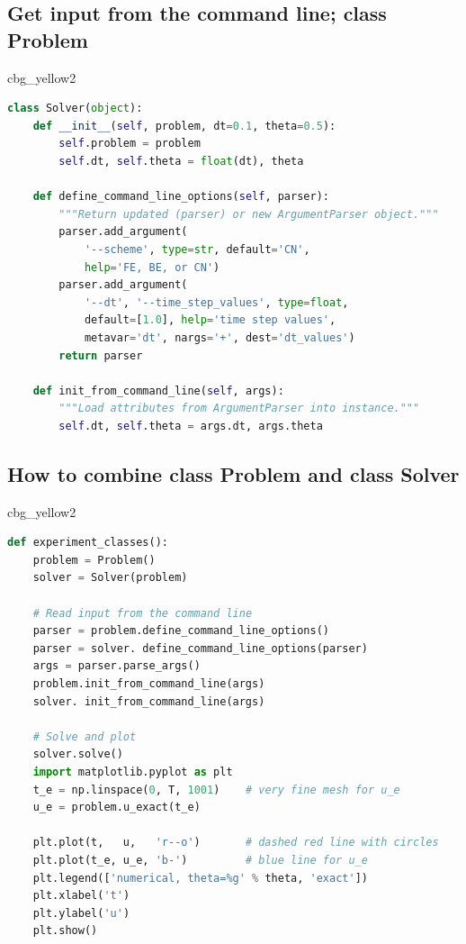 \documentclass[%
oneside,                 %
final,                   %
10pt]{article}
\newenvironment{_cod_tight}[1]{
   \def\FrameCommand{\colorbox{#1}}
   \FrameRule0.6pt\MakeFramed {\FrameRestore}\vskip3mm}
   {\vskip0mm\endMakeFramed}
\newenvironment{cod}[1]{
\bgroup\rmfamily
\fboxsep=0mm\relax
\begin{_cod_tight}{#1}
\list{}{\parsep=-2mm\parskip=0mm\topsep=0pt\leftmargin=2mm
\rightmargin=2\leftmargin\leftmargin=4pt\relax}
\item\relax}
{\endlist\end{_cod_tight}\egroup}
\begin{document}
\subsection*{Get input from the command line; class Problem}

\begin{cod}{cbg_yellow2}\begin{lstlisting}[language=Python,style=simple,xleftmargin=2mm]
class Solver(object):
    def __init__(self, problem, dt=0.1, theta=0.5):
        self.problem = problem
        self.dt, self.theta = float(dt), theta

    def define_command_line_options(self, parser):
        """Return updated (parser) or new ArgumentParser object."""
        parser.add_argument(
            '--scheme', type=str, default='CN',
            help='FE, BE, or CN')
        parser.add_argument(
            '--dt', '--time_step_values', type=float,
            default=[1.0], help='time step values',
            metavar='dt', nargs='+', dest='dt_values')
        return parser

    def init_from_command_line(self, args):
        """Load attributes from ArgumentParser into instance."""
        self.dt, self.theta = args.dt, args.theta
\end{lstlisting}\end{cod}
\noindent

\subsection*{How to combine class Problem and class Solver}

\begin{cod}{cbg_yellow2}\begin{lstlisting}[language=Python,style=simple,xleftmargin=2mm]
def experiment_classes():
    problem = Problem()
    solver = Solver(problem)

    # Read input from the command line
    parser = problem.define_command_line_options()
    parser = solver. define_command_line_options(parser)
    args = parser.parse_args()
    problem.init_from_command_line(args)
    solver. init_from_command_line(args)

    # Solve and plot
    solver.solve()
    import matplotlib.pyplot as plt
    t_e = np.linspace(0, T, 1001)    # very fine mesh for u_e
    u_e = problem.u_exact(t_e)

    plt.plot(t,   u,   'r--o')       # dashed red line with circles
    plt.plot(t_e, u_e, 'b-')         # blue line for u_e
    plt.legend(['numerical, theta=%g' % theta, 'exact'])
    plt.xlabel('t')
    plt.ylabel('u')
    plt.show()
\end{lstlisting}\end{cod}
\noindent
\end{document}
